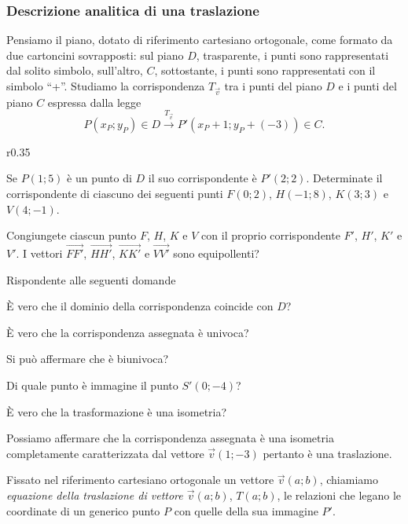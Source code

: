 \subsubsection{Descrizione analitica di una traslazione}

Pensiamo il piano, dotato di riferimento cartesiano ortogonale, come 
formato da due cartoncini sovrapposti: sul piano $D$, trasparente, i 
punti sono rappresentati dal solito simbolo, sull'altro, $C$, 
sottostante, i punti sono rappresentati con il simbolo ``+''.
Studiamo la corrispondenza $T_{\vec{v}}$ tra i punti del piano $D$ e 
i punti del piano $C$ espressa dalla legge
\[P(x_P;y_P)\in D \overset{T_{\vec{v}}}\rightarrow 
P'(x_P+1;y_P+(-3))\in C.\]

\setlength{\intextsep}{3pt plus 2.0pt minus 2.0pt}
\begin{wrapfigure}{r}{0.35\textwidth}
  \centering
\end{wrapfigure}

Se $P(1;5)$ è un punto di $D$ il suo corrispondente è $P'(2;2)$. 
Determinate il corrispondente di ciascuno dei seguenti punti 
$F(0;2)$, $H(-1;8)$, $K(3;3)$ e $V(4;-1)$.

Congiungete ciascun punto $F$, $H$, $K$ e $V$ con il proprio 
corrispondente $F'$, $H'$, $K'$ e $V'$. I vettori 
$\overrightarrow{FF'}$, $\overrightarrow{HH'}$, 
$\overrightarrow{KK'}$ e $\overrightarrow{VV'}$ sono equipollenti?

Rispondente alle seguenti domande
\begin{itemize*}
  \item \`E vero che il dominio della corrispondenza coincide con $D$?
  \item \`E vero che la corrispondenza assegnata è univoca?
  \item Si può affermare che è biunivoca?
  \item Di quale punto è immagine il punto $S'(0;-4)$?
  \item \`E vero che la trasformazione è una isometria?
\end{itemize*}

Possiamo affermare che la corrispondenza assegnata è una isometria 
completamente caratterizzata dal vettore $\vec{v}(1;-3)$ pertanto è 
una traslazione.

\begin{definizione}
  Fissato nel riferimento cartesiano ortogonale un vettore 
  $\vec{v}(a;b)$, chiamiamo \emph{equazione della traslazione di 
    vettore $\vec{v}(a;b)$}, $T(a;b)$, le relazioni che legano le 
  coordinate di un generico punto $P$ con quelle della sua immagine 
  $P'$.
\end{definizione}

